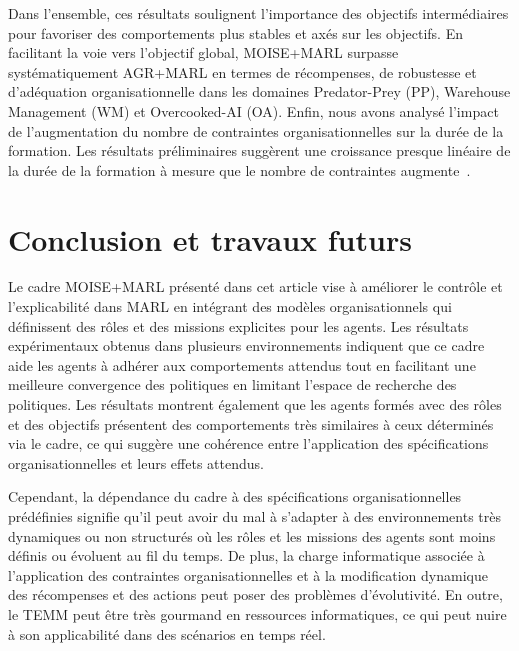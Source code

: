 Dans l'ensemble, ces résultats soulignent l'importance des objectifs intermédiaires pour favoriser des comportements plus stables et axés sur les objectifs. En facilitant la voie vers l'objectif global, MOISE+MARL surpasse systématiquement AGR+MARL en termes de récompenses, de robustesse et d'adéquation organisationnelle dans les domaines Predator-Prey (PP), Warehouse Management (WM) et Overcooked-AI (OA).
Enfin, nous avons analysé l'impact de l'augmentation du nombre de contraintes organisationnelles sur la durée de la formation. Les résultats préliminaires suggèrent une croissance presque linéaire de la durée de la formation à mesure que le nombre de contraintes augmente~\footnotemark[1].

\section{Conclusion et travaux futurs}
\label{sec:discussion_conclusion_future_work}

Le cadre MOISE+MARL présenté dans cet article vise à améliorer le contrôle et l'explicabilité dans MARL en intégrant des modèles organisationnels qui définissent des rôles et des missions explicites pour les agents. Les résultats expérimentaux obtenus dans plusieurs environnements indiquent que ce cadre aide les agents à adhérer aux comportements attendus tout en facilitant une meilleure convergence des politiques en limitant l'espace de recherche des politiques. Les résultats montrent également que les agents formés avec des rôles et des objectifs présentent des comportements très similaires à ceux déterminés via le cadre, ce qui suggère une cohérence entre l'application des spécifications organisationnelles et leurs effets attendus.

Cependant, la dépendance du cadre à des spécifications organisationnelles prédéfinies signifie qu'il peut avoir du mal à s'adapter à des environnements très dynamiques ou non structurés où les rôles et les missions des agents sont moins définis ou évoluent au fil du temps.
De plus, la charge informatique associée à l'application des contraintes organisationnelles et à la modification dynamique des récompenses et des actions peut poser des problèmes d'évolutivité. En outre, le TEMM peut être très gourmand en ressources informatiques, ce qui peut nuire à son applicabilité dans des scénarios en temps réel.

